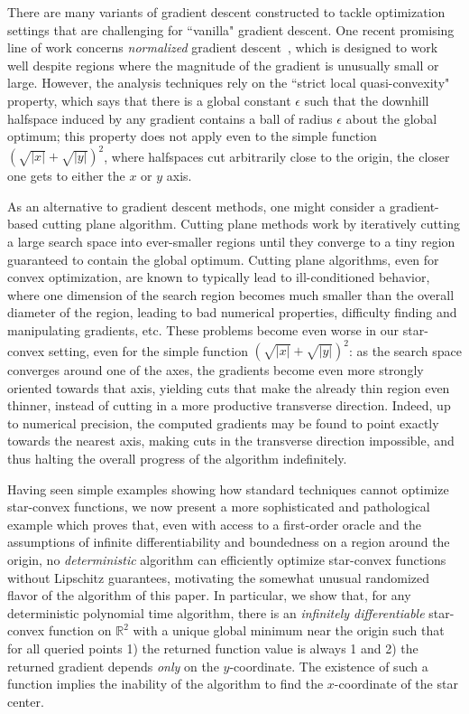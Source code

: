 \documentclass[11pt,letter]{article}
\newcommand{\Real}{\mathbb{R}}
\numberwithin{nTheorems}{section}
\begin{document}
There are many variants of gradient descent constructed to tackle optimization settings that are challenging for ``vanilla" gradient descent. One recent promising line of work concerns \emph{normalized} gradient descent~\cite{Hazan:2015}, which is designed to work well despite regions where the magnitude of the gradient is unusually small or large. However, the analysis techniques rely on the ``strict local quasi-convexity" property, which says that there is a global constant $\epsilon$ such that the downhill halfspace induced by any gradient contains a ball of radius $\epsilon$ about the global optimum; this property does not apply even to the simple function $(\sqrt{|x|}+\sqrt{|y|})^2$, where halfspaces cut arbitrarily close to the origin, the closer one gets to either the $x$ or $y$ axis.

As an alternative to gradient descent methods, one might consider a gradient-based cutting plane algorithm. Cutting plane methods work by iteratively cutting a large search space into ever-smaller regions until they converge to a tiny region guaranteed to contain the global optimum. Cutting plane algorithms, even for convex optimization, are known to typically lead to ill-conditioned behavior, where one dimension of the search region becomes much smaller than the overall diameter of the region, leading to bad numerical properties, difficulty finding and manipulating gradients, etc. These problems become even worse in our star-convex setting, even for the simple function $(\sqrt{|x|}+\sqrt{|y|})^2$: as the search space converges around one of the axes, the gradients become even more strongly oriented towards that axis, yielding cuts that make the already thin region even thinner, instead of cutting in a more productive transverse direction. Indeed, up to numerical precision, the computed gradients may be found to point exactly towards the nearest axis, making cuts in the transverse direction impossible, and thus halting the overall progress of the algorithm indefinitely.

Having seen simple examples showing how standard techniques cannot optimize star-convex functions, we now present a more sophisticated and pathological example which proves that, even with access to a first-order oracle and the assumptions of infinite differentiability and boundedness on a region around the origin, no \emph{deterministic} algorithm can efficiently optimize star-convex functions without Lipschitz guarantees, motivating the somewhat unusual randomized flavor of the algorithm of this paper.
In particular, we show that, for any deterministic polynomial time algorithm, there is an \emph{infinitely differentiable} star-convex function on $\Real^2$ with a unique global minimum near the origin such that for all queried points 1) the returned function value is always 1 and 2) the returned gradient depends \emph{only} on the $y$-coordinate.
The existence of such a function implies the inability of the algorithm to find the $x$-coordinate of the star center.
\end{document}
